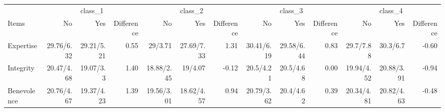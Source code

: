 \begin{longtable}{l|rrrrrrrrrrrr}
\toprule
\multicolumn{1}{l}{} & \multicolumn{3}{c}{class\_1} & \multicolumn{3}{c}{class\_2} & \multicolumn{3}{c}{class\_3} & \multicolumn{3}{c}{class\_4} \\ 
\cmidrule(lr){2-4} \cmidrule(lr){5-7} \cmidrule(lr){8-10} \cmidrule(lr){11-13}
\multicolumn{1}{l}{Items} & No & Yes & Difference & No & Yes & Difference & No & Yes & Difference & No & Yes & Difference \\ 
\midrule\addlinespace[2.5pt]
Expertise & 29.76/6.32 & 29.21/5.21 & 0.55 & 29/3.71 & 27.69/7.33 & 1.31 & 30.41/6.19 & 29.58/6.44 & 0.83 & 29.7/7.88 & 30.3/6.7 & -0.60 \\ 
Integrity & 20.47/4.68 & 19.07/3.3 & 1.40 & 18.88/2.45 & 19/4.07 & -0.12 & 20.5/4.21 & 20.5/4.68 & 0.00 & 19.94/4.52 & 20.88/3.91 & -0.94 \\ 
Benevolence & 20.76/4.67 & 19.37/4.23 & 1.39 & 19.56/3.01 & 18.62/4.57 & 0.94 & 20.79/3.62 & 20.4/4.62 & 0.39 & 20.34/4.81 & 20.82/4.63 & -0.48 \\ 
\bottomrule
\end{longtable}

